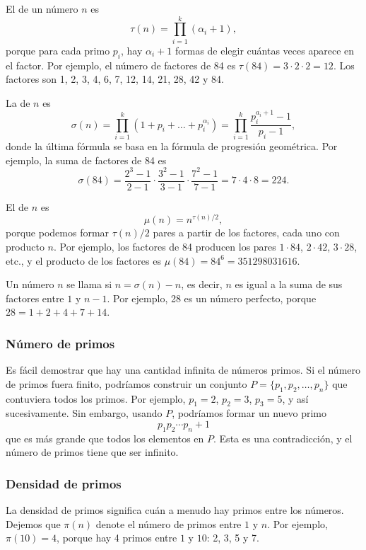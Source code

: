 El  de un número $n$ es
\[\tau(n)=\prod_{i=1}^k (\alpha_i+1),\]
porque para cada primo $p_i$, hay
$\alpha_i+1$ formas de elegir cuántas veces
aparece en el factor.
Por ejemplo, el número de factores
de 84 es
$\tau(84)=3 \cdot 2 \cdot 2 = 12$.
Los factores son
1, 2, 3, 4, 6, 7, 12, 14, 21, 28, 42 y 84.

La  de $n$ es
\[\sigma(n)=\prod_{i=1}^k (1+p_i+\ldots+p_i^{\alpha_i}) = \prod_{i=1}^k \frac{p_i^{a_i+1}-1}{p_i-1},\]
donde la última fórmula se basa en la fórmula de progresión geométrica.
Por ejemplo, la suma de factores de 84 es
\[\sigma(84)=\frac{2^3-1}{2-1} \cdot \frac{3^2-1}{3-1} \cdot \frac{7^2-1}{7-1} = 7 \cdot 4 \cdot 8 = 224.\]

El  de $n$ es
\[\mu(n)=n^{\tau(n)/2},\]
porque podemos formar $\tau(n)/2$ pares a partir de los factores,
cada uno con producto $n$.
Por ejemplo, los factores de 84
producen los pares
$1 \cdot 84$, $2 \cdot 42$, $3 \cdot 28$, etc.,
y el producto de los factores es $\mu(84)=84^6=351298031616$.


Un número $n$ se llama  si $n=\sigma(n)-n$,
es decir, $n$ es igual a la suma de sus factores
entre $1$ y $n-1$.
Por ejemplo, 28 es un número perfecto,
porque $28=1+2+4+7+14$.

\subsubsection{Número de primos}

Es fácil demostrar que hay una cantidad infinita
de números primos.
Si el número de primos fuera finito,
podríamos construir un conjunto $P=\{p_1,p_2,\ldots,p_n\}$
que contuviera todos los primos.
Por ejemplo, $p_1=2$, $p_2=3$, $p_3=5$, y así sucesivamente.
Sin embargo, usando $P$, podríamos formar un nuevo primo
\[p_1 p_2 \cdots p_n+1\]
que es más grande que todos los elementos en $P$.
Esta es una contradicción, y el número de primos
tiene que ser infinito.

\subsubsection{Densidad de primos}

La densidad de primos significa cuán a menudo hay primos
entre los números.
Dejemos que $\pi(n)$ denote el número de primos entre
$1$ y $n$. Por ejemplo, $\pi(10)=4$, porque
hay 4 primos entre $1$ y $10$: 2, 3, 5 y 7.

